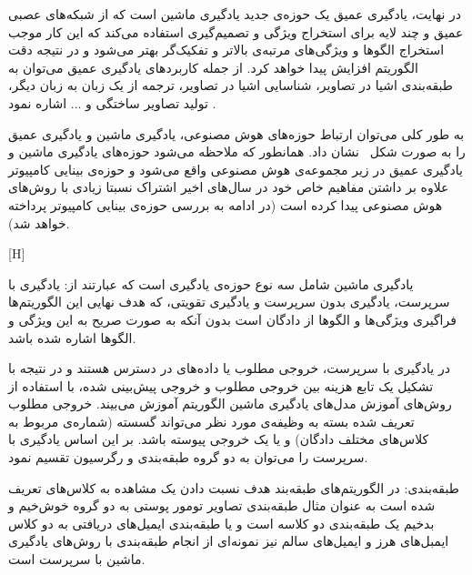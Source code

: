 در نهایت، یادگیری عمیق یک حوزه‌ی جدید یادگیری ماشین است که از شبکه‌های عصبی عمیق و چند لایه برای استخراج ویژگی و تصمیم‌گیری استفاده می‌کند که این کار موجب استخراج الگوها و ویژگی‌های مرتبه‌ی بالاتر و تفکیک‌گر بهتر می‌شود و در نتیجه دقت الگوریتم افزایش پیدا خواهد کرد. از جمله کاربرد‌های یادگیری عمیق می‌توان به طبقه‌بندی اشیا در تصاویر، شناسایی اشیا در تصاویر، ترجمه از یک زبان به زبان دیگر، تولید تصاویر ساختگی و ... اشاره نمود . 

به طور کلی می‌توان ارتباط حوزه‌های هوش مصنوعی، یادگیری ماشین و یادگیری عمیق را به صورت شکل~ نشان داد. همانطور که ملاحظه می‌شود حوزه‌های یادگیری ماشین و یادگیری عمیق در زیر مجموعه‌ی هوش مصنوعی واقع می‌شود و حوزه‌ی بینایی کامپیوتر علاوه بر داشتن مفاهیم خاص خود در سال‌های اخیر اشتراک نسبتا زیادی با روش‌های هوش مصنوعی پیدا کرده است (در ادامه به بررسی حوزه‌ی بینایی کامپیوتر پرداخته خواهد شد).

[H]


یادگیری ماشین شامل سه نوع حوزه‌ی یادگیری است که عبارتند از: یادگیری با سرپرست، یادگیری بدون سرپرست و یادگیری تقویتی، که هدف نهایی این الگوریتم‌ها فراگیری ویژگی‌ها و الگوها از دادگان است بدون آنکه به صورت صریح به این ویژگی‌ و الگوها اشاره شده باشد.

در یادگیری با سرپرست، خروجی مطلوب یا داده‌های  در دسترس هستند و در نتیجه با تشکیل یک تابع هزینه بین خروجی مطلوب و خروجی پیش‌بینی شده، با استفاده از روش‌های آموزش مدل‌های یادگیری ماشین الگوریتم آموزش می‌بیند. خروجی مطلوب تعریف شده بسته به وظیفه‌ی مورد نظر می‌تواند گسسته (شماره‌ی مربوط به کلاس‌های مختلف دادگان) و یا یک خروجی پیوسته باشد. بر این اساس یادگیری با سرپرست را می‌توان به دو گروه طبقه‌بندی و رگرسیون تقسیم نمود.

 طبقه‌بندی: در الگوریتم‌های طبقه‌بند هدف نسبت دادن یک مشاهده‌ به کلاس‌های تعریف شده است به عنوان مثال طبقه‌بندی تصاویر تومور پوستی به دو گروه خوش‌خیم و بدخیم یک طبقه‌بندی دو کلاسه است و یا طبقه‌بندی ایمیل‌های دریافتی به دو کلاس‌ ایمبل‌های هرز و ایمیل‌های سالم نیز نمونه‌ای از انجام طبقه‌بندی با روش‌های یادگیری ماشین با سرپرست است.


